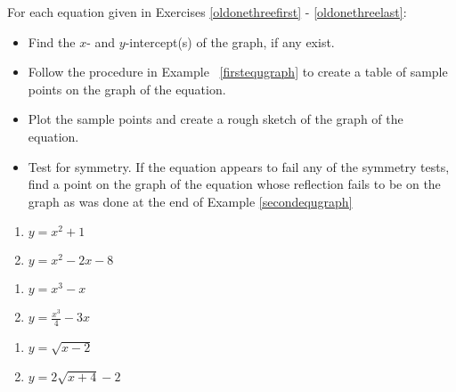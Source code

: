 For each equation given in Exercises \ref{oldonethreefirst} - \ref{oldonethreelast}:

\begin{itemize}

\item Find the $x$- and $y$-intercept(s) of the graph, if any exist.

\item Follow the procedure in Example \hspace{-.1in} ~\ref{firstequgraph} to create a table of sample points on the graph of the equation.

\item Plot the sample points and create a rough sketch of the graph of the equation.

\item Test for symmetry.  If the equation appears to fail any of the symmetry tests, find a point on the graph of the equation whose reflection fails to be on the graph as was done at the end of Example \ref{secondequgraph}

\end{itemize}

\begin{multicols}{2}
\begin{enumerate}
\setcounter{enumi}{\value{HW}}



\item $y = x^{2} + 1$ \label{oldonethreefirst}
\item  $y = x^2-2x-8$

\setcounter{HW}{\value{enumi}}
\end{enumerate}
\end{multicols}

\begin{multicols}{2}
\begin{enumerate}
\setcounter{enumi}{\value{HW}}

\item $y = x^{3} - x$
\item  $y = \frac{x^3}{4} - 3x$

\setcounter{HW}{\value{enumi}}
\end{enumerate}
\end{multicols}

\begin{multicols}{2}
\begin{enumerate}
\setcounter{enumi}{\value{HW}}

\item $y = \sqrt{x - 2}$
\item  $y = 2 \sqrt{x+4} - 2$

\setcounter{HW}{\value{enumi}}
\end{enumerate}
\end{multicols}

